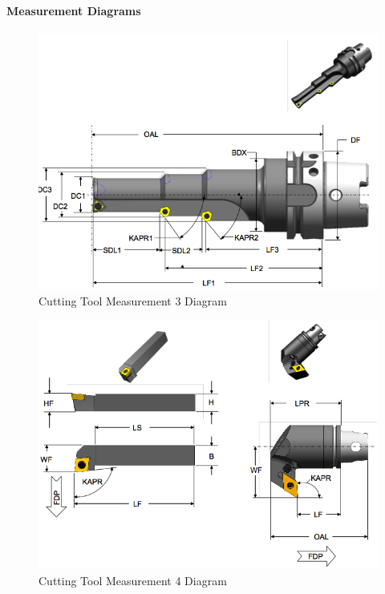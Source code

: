 \paragraph{Measurement Diagrams}
\label{sec:Measurement Diagrams}

\begin{figure}[ht]
  \centering
    \includegraphics[width=1.0\textwidth]{figures/Cutting Tool Measurement 3.png}
  \caption{Cutting Tool Measurement 3 Diagram}
  \label{fig:Cutting Tool Measurement 3 Diagram}
\end{figure}

\FloatBarrier


\begin{figure}[ht]
  \centering
    \includegraphics[width=1.0\textwidth]{figures/Cutting Tool Measurement 4.png}
  \caption{Cutting Tool Measurement 4 Diagram}
  \label{fig:Cutting Tool Measurement 4 Diagram}
\end{figure}

